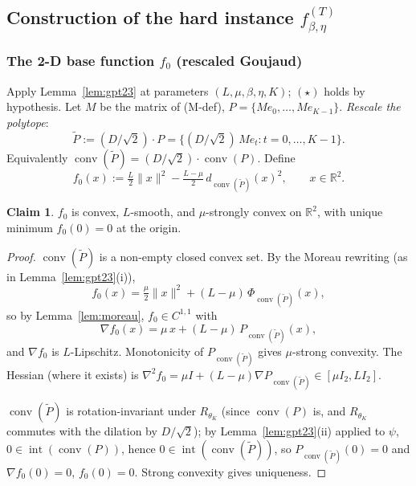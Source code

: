 \documentclass[11pt]{article}
\theoremstyle{definition}
\newtheorem{claim}[theorem]{Claim}
\theoremstyle{remark}
\DeclareMathOperator{\conv}{conv}
\DeclareMathOperator{\interior}{int}
\begin{document}
\subsection{Construction of the hard instance \texorpdfstring{$f_{\beta,\eta}^{(T)}$}{f}}
\label{sec:construction}

\subsubsection{The 2-D base function \texorpdfstring{$f_0$}{f0} (rescaled Goujaud)}

Apply Lemma~\ref{lem:gpt23} at parameters $(L, \mu, \beta, \eta, K)$; $(\star)$ holds by hypothesis. Let $M$ be the matrix of (M-def), $P = \{M e_0, \ldots, M e_{K-1}\}$. \emph{Rescale the polytope}:
\[
  \widetilde P := (D/\sqrt 2) \cdot P = \{(D/\sqrt 2)\, M e_t : t = 0, \ldots, K-1\}.
\]
Equivalently $\conv(\widetilde P) = (D/\sqrt 2) \cdot \conv(P)$. Define
\begin{equation}
  f_0(x) := \tfrac{L}{2}\|x\|^2 - \tfrac{L - \mu}{2}\, d_{\conv(\widetilde P)}(x)^2,\qquad x \in \mathbb{R}^2.\tag{F0}
\end{equation}

\begin{claim}
\label{cl:f0-regularity}
$f_0$ is convex, $L$-smooth, and $\mu$-strongly convex on $\mathbb{R}^2$, with unique minimum $f_0(0) = 0$ at the origin.
\end{claim}

\begin{proof}
$\conv(\widetilde P)$ is a non-empty closed convex set. By the Moreau rewriting (as in Lemma~\ref{lem:gpt23}(i)),
\[
  f_0(x) = \tfrac{\mu}{2}\|x\|^2 + (L - \mu)\, \Phi_{\conv(\widetilde P)}(x),
\]
so by Lemma~\ref{lem:moreau}, $f_0 \in C^{1,1}$ with
\begin{equation}
  \nabla f_0(x) = \mu\, x + (L - \mu)\, P_{\conv(\widetilde P)}(x),\tag{F0-grad}
\end{equation}
and $\nabla f_0$ is $L$-Lipschitz. Monotonicity of $P_{\conv(\widetilde P)}$ gives $\mu$-strong convexity. The Hessian (where it exists) is $\nabla^2 f_0 = \mu I + (L-\mu)\nabla P_{\conv(\widetilde P)} \in [\mu I_2, L I_2]$.

$\conv(\widetilde P)$ is rotation-invariant under $R_{\theta_K}$ (since $\conv(P)$ is, and $R_{\theta_K}$ commutes with the dilation by $D/\sqrt 2$); by Lemma~\ref{lem:gpt23}(ii) applied to $\psi$, $0 \in \interior(\conv(P))$, hence $0 \in \interior(\conv(\widetilde P))$, so $P_{\conv(\widetilde P)}(0) = 0$ and $\nabla f_0(0) = 0$, $f_0(0) = 0$. Strong convexity gives uniqueness.
\end{proof}
\end{document}

